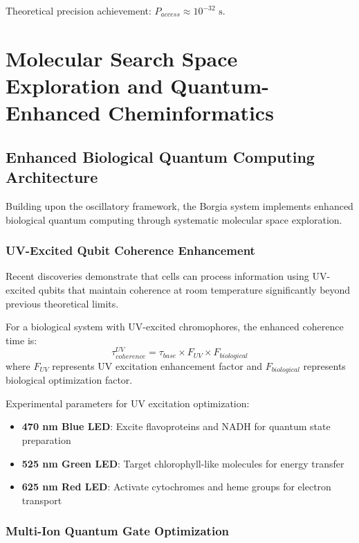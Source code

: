 \documentclass[11pt,a4paper]{article}
\begin{document}
Theoretical precision achievement: $P_{access} \approx 10^{-32} \text{ s}$.

\section{Molecular Search Space Exploration and Quantum-Enhanced Cheminformatics}

\subsection{Enhanced Biological Quantum Computing Architecture}

Building upon the oscillatory framework, the Borgia system implements enhanced biological quantum computing through systematic molecular space exploration.

\subsubsection{UV-Excited Qubit Coherence Enhancement}

Recent discoveries demonstrate that cells can process information using UV-excited qubits that maintain coherence at room temperature significantly beyond previous theoretical limits.

\begin{definition}
For a biological system with UV-excited chromophores, the enhanced coherence time is:
\begin{equation}
\tau_{coherence}^{UV} = \tau_{base} \times F_{UV} \times F_{biological}
\end{equation}
where $F_{UV}$ represents UV excitation enhancement factor and $F_{biological}$ represents biological optimization factor.
\end{definition}

Experimental parameters for UV excitation optimization:
\begin{itemize}
\item \textbf{470 nm Blue LED}: Excite flavoproteins and NADH for quantum state preparation
\item \textbf{525 nm Green LED}: Target chlorophyll-like molecules for energy transfer  
\item \textbf{625 nm Red LED}: Activate cytochromes and heme groups for electron transport
\end{itemize}

\subsubsection{Multi-Ion Quantum Gate Optimization}
\end{document}
